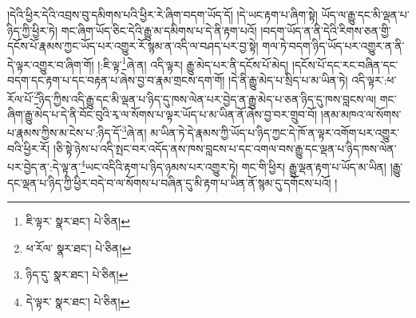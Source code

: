 །དེའི་ཕྱིར་དེའི་འབྲས་བུ་དམིགས་པའི་ཕྱིར་རེ་ཞིག་བདག་ཡོད་དོ། །དེ་ཡང་རྟག་པ་ཞིག་སྟེ། ཡོད་ལ་རྒྱུ་དང་མི་ལྡན་པ་ཉིད་ཀྱི་ཕྱིར་ཏེ། གང་ཞིག་ཡོད་ཅིང་དེའི་རྒྱུ་མ་དམིགས་པ་དེ་ནི་རྟག་པའོ། །བདག་ཡོད་ན་ནི་དེའི་རིགས་ཅན་གྱི་དངོས་པོ་རྣམས་ཀྱང་ཡོད་པར་འགྱུར་རོ་སྙམ་ན་འདི་ལ་བཤད་པར་བྱ་སྟེ། གལ་ཏེ་བདག་ཉིད་ཡོད་པར་འགྱུར་ན་ནི་དེ་ལྟར་འགྱུར་བ་ཞིག་གོ། །:ཇི་ལྟ་\footnote{ཇི་ལྟར་  སྣར་ཐང་།  པེ་ཅིན། }ཞེ་ན། འདི་ལྟར། རྒྱུ་མེད་པར་ནི་དངོས་པོ་མེད། །དངོས་པོ་དང་རང་བཞིན་དང་བདག་དང་རྟག་པ་དང་བརྟན་པ་ཞེས་བྱ་བ་རྣམ་གྲངས་དག་གོ། །དེ་ནི་རྒྱུ་མེད་པ་སྲིད་པ་མ་ཡིན་ཏེ། འདི་ལྟར་:ཕ་རོལ་པོ་\footnote{ཕ་རོལ་  སྣར་ཐང་།  པེ་ཅིན། }ཉིད་ཀྱིས་འདི་རྒྱུ་དང་མི་ལྡན་པ་ཉིད་དུ་ཁས་ལེན་པར་བྱེད་ན་རྒྱུ་མེད་པ་ཅན་ཉིད་དུ་ཁས་བླངས་ལ། གང་ཞིག་རྒྱུ་མེད་པ་དེ་ནི་བོང་བུའི་རྭ་ལ་སོགས་པ་ལྟར་ཡོད་པ་མ་ཡིན་ནོ་ཞེས་བྱ་བར་གྲུབ་བོ། །ནམ་མཁའ་ལ་སོགས་པ་རྣམས་ཀྱིས་མ་ངེས་པ་:ཉིད་དོ་\footnote{ཉིད་དུ་  སྣར་ཐང་།  པེ་ཅིན། }ཞེ་ན། མ་ཡིན་ཏེ་དེ་རྣམས་ཀྱི་ཡོད་པ་ཉིད་ཀྱང་དེ་ཁོ་ན་ལྟར་འགོག་པར་འགྱུར་བའི་ཕྱིར་རོ། །ཅི་སྟེ་ཉེས་པ་འདི་སྤང་བར་འདོད་ནས་ཁས་བླངས་པ་དང་འགལ་བས་རྒྱུ་དང་ལྡན་པ་ཉིད་ཁས་ལེན་པར་བྱེད་ན་:དེ་ལྟ་ན་\footnote{དེ་ལྟར་  སྣར་ཐང་།  པེ་ཅིན། }ཡང་འདིའི་རྟག་པ་ཉིད་ཉམས་པར་འགྱུར་ཏེ། གང་གི་ཕྱིར། རྒྱུ་ལྡན་རྟག་པ་ཡོད་མ་ཡིན། །རྒྱུ་དང་ལྡན་པ་ཉིད་ཀྱི་ཕྱིར་བདེ་བ་ལ་སོགས་པ་བཞིན་དུ་མི་རྟག་པ་ཡིན་ནོ་སྙམ་དུ་དགོངས་པའོ། །

